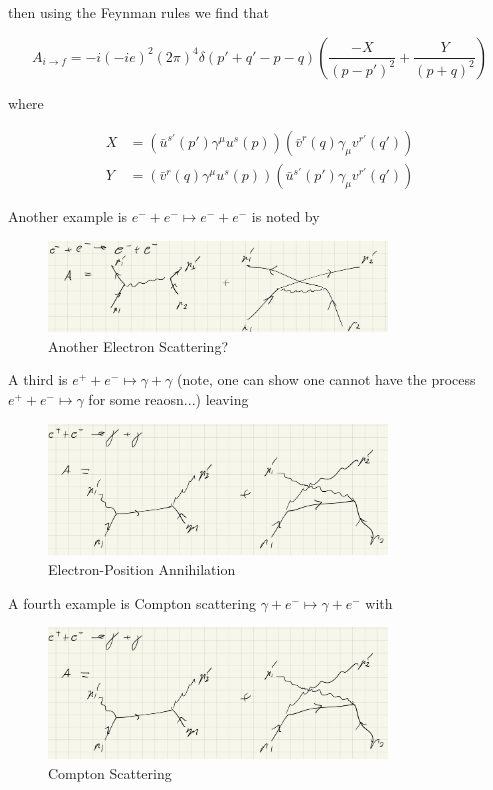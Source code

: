 \documentclass{article}
\theoremstyle{definition}
\begin{document}
then using the Feynman rules we find that

$$ A_{i \to f} = -i(-ie)^2 (2\pi)^4 \delta(p' + q' - p - q) \left( \frac{-X}{(p
    - p')^2} + \frac{Y}{(p + q)^2} \right) $$
  
where

\begin{align*}
X &= (\bar{u}^{s'}(p') \gamma^\mu u^s(p)) (\bar{v}^r(q) \gamma_\mu v^{r'}(q')) \\
Y &= (\bar{v}^r(q) \gamma^\mu u^s(p)) (\bar{u}^{s'}(p') \gamma_\mu v^{r'}(q'))
\end{align*}

Another example is $e^- + e^- \mapsto e^- + e^-$ is noted by

\begin{figure}[H]
\centering
\includegraphics[width=9cm]{res/QFT/qed_electron_scattering_2}
\caption{Another Electron Scattering?}
\label{qed_electron_scattering_2}
\end{figure}

A third is $e^+ + e^- \mapsto \gamma + \gamma$ (note, one can
show one cannot have the process $e^+ + e^- \mapsto \gamma$ for some reaosn...)
leaving

\begin{figure}[H]
\centering
\includegraphics[width=9cm]{res/QFT/electron_positron_annihilation}
\caption{Electron-Position Annihilation}
\label{electron_position_annihilation}
\end{figure}

A fourth example is Compton scattering $\gamma + e^- \mapsto \gamma + e^-$ with

\begin{figure}[H]
\centering
\includegraphics[width=9cm]{res/QFT/compton_scattering}
\caption{Compton Scattering}
\label{compton_scattering}
\end{figure}
\end{document}
